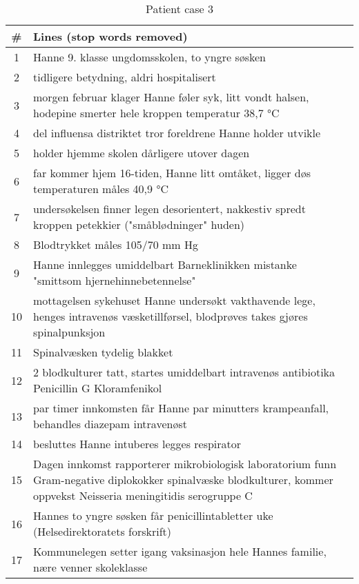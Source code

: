 \begin{table}[htbp] \footnotesize \center
\caption{Patient case 3\label{tab:pcase3}}
\begin{tabularx}{\textwidth}{c X}
    \toprule
    \# & Lines (stop words removed) \\
    \midrule
	1 & Hanne 9. klasse ungdomsskolen, to yngre søsken \\
	2 & tidligere betydning, aldri hospitalisert \\
	3 & morgen februar klager Hanne føler syk, litt vondt halsen, hodepine smerter hele kroppen temperatur 38,7 °C \\
	4 & del influensa distriktet tror foreldrene Hanne holder utvikle \\
	5 & holder hjemme skolen dårligere utover dagen \\
	6 & far kommer hjem 16-tiden, Hanne litt omtåket, ligger døs temperaturen måles 40,9 °C \\
	7 & undersøkelsen finner legen desorientert, nakkestiv spredt kroppen petekkier ("småblødninger" huden) \\
	8 & Blodtrykket måles 105/70 mm Hg \\
	9 & Hanne innlegges umiddelbart Barneklinikken mistanke "smittsom hjernehinnebetennelse" \\
	10 & mottagelsen sykehuset Hanne undersøkt vakthavende lege, henges intravenøs væsketillførsel, blodprøves takes gjøres spinalpunksjon \\
	11 & Spinalvæsken tydelig blakket \\
	12 & 2 blodkulturer tatt, startes umiddelbart intravenøs antibiotika Penicillin G Kloramfenikol \\
	13 & par timer innkomsten får Hanne par minutters krampeanfall, behandles diazepam intravenøst \\
	14 & besluttes Hanne intuberes legges respirator \\
	15 & Dagen innkomst rapporterer mikrobiologisk laboratorium funn Gram-negative diplokokker spinalvæske blodkulturer, kommer oppvekst Neisseria meningitidis serogruppe C \\
	16 & Hannes to yngre søsken får penicillintabletter uke (Helsedirektoratets forskrift) \\
	17 & Kommunelegen setter igang vaksinasjon hele Hannes familie, nære venner skoleklasse \\
	\bottomrule
\end{tabularx}
\end{table}


